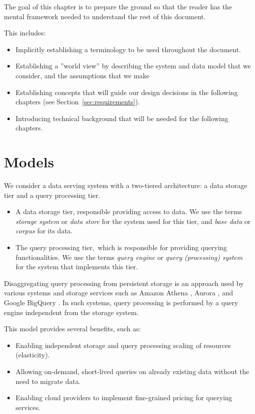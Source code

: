 \begin{tcolorbox}
The goal of this chapter is to prepare the ground so that the reader has the mental framework needed to understand the
rest of this document.

This includes:
\begin{itemize}
  \item Implicitly establishing a terminology to be used throughout the document.
  \item Establishing a ''world view'' by describing the system and data model that we consider, and the assumptions that
  we make
  \item Establishing concepts that will guide our design decisions in the following chapters (see
  Section~\ref{sec:requirements}).
  \item Introducing technical background that will be needed for the following chapters.
\end{itemize}
\end{tcolorbox}

\section{Models}
We consider a data serving system with a two-tiered architecture: a data storage tier and a query processing tier.

\begin{itemize}
\item A data storage tier, responsible providing access to data.
We use the terms \textit{storage system} or \textit{data store} for the system used for this tier, and \textit{base data}
or \textit{corpus} for its data.
\item The query processing tier, which is responsible for providing querying functionalities.
We use the terms \textit{query engine} or \textit{query (processing) system} for the system that implements this tier.
\end{itemize}

Disaggregating query processing from persistent storage is an approach used by various systems and storage
services such as Amazon Athena \cite{aws:athena}, Aurora \cite{aws:aurora}, and Google BigQuery
\cite{google:bigquery}.
In such systems, query processing is performed by a query engine independent from the storage system.

This model provides several benefits, such as:
\begin{itemize}
  \item Enabling independent storage and query processing scaling of resources (elasticity).
  \item Allowing on-demand, short-lived queries on already existing data without the need to migrate data.
  \item Enabling cloud providers to implement fine-grained pricing for querying services.
\end{itemize}

